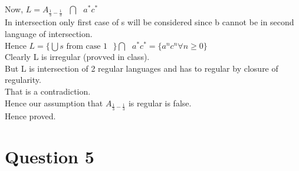 \documentclass{article}
\begin{document}
Now, $L = A_{\frac{1}{3}-\frac{1}{3}} \text{ } \bigcap \text{ } a^*c^* $\\
In intersection only first case of s will be considered since b cannot be in second language of intersection.\\
Hence $L = \{ \bigcup {s \text{ from case 1}} \text{ } \} \bigcap \text{ } a^*c^* = \{a^nc^n \forall n \geq 0 \}$ \\
Clearly L is irregular (provved in class).\\
But L is intersection of 2 regular languages and has to regular by closure of regularity.\\
That is a contradiction.\\
Hence our assumption that $A_{\frac{1}{3}-\frac{1}{3}}$ is regular is false.\\
Hence proved.

\pagebreak


\section{Question 5}


\pagebreak
\end{document}
